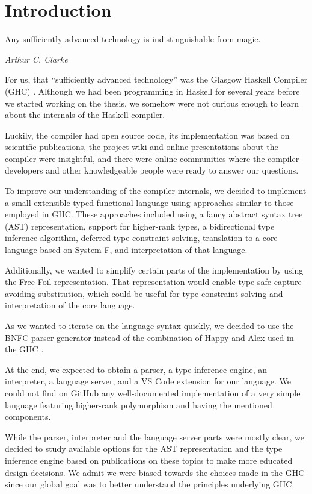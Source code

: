 \chapter{Introduction}
\label{chap:Introduction}

\epigraph{Any sufficiently advanced technology is indistinguishable from magic.}{\textit{Arthur C. Clarke}}

For us, that ``sufficiently advanced technology'' was the Glasgow Haskell Compiler (GHC) \cite{ghc-site}.
Although we had been programming in Haskell for several years before we started working on the thesis, we somehow were not curious enough to learn about the internals of the Haskell compiler.

Luckily, the compiler had open source code, its implementation was based on scientific publications, the project wiki and online presentations about the compiler were insightful, and there were online communities where the compiler developers and other knowledgeable people were ready to answer our questions.

To improve our understanding of the compiler internals, we decided to implement a small extensible typed functional language using approaches similar to those employed in GHC.
These approaches included using a fancy abstract syntax tree (AST) representation, support for higher-rank types, a bidirectional type inference algorithm, deferred type constraint solving, translation to a core language based on System F, and interpretation of that language.

Additionally, we wanted to simplify certain parts of the implementation by using the Free Foil \cite{kudasov-free-2024} representation. That representation would enable type-safe capture-avoiding substitution, which could be useful for type constraint solving and interpretation of the core language.

As we wanted to iterate on the language syntax quickly, we decided to use the BNFC parser generator \cite{bnfc-parser-generator} instead of the combination of Happy and Alex used in the GHC \cite{ghc-2025}.

At the end, we expected to obtain a parser, a type inference engine, an interpreter, a language server, and a VS Code extension for our language. We could not find on GitHub any well-documented implementation of a very simple language featuring higher-rank polymorphism and having the mentioned components.

While the parser, interpreter and the language server parts were mostly clear, we decided to study available options for the AST representation and the type inference engine based on publications on these topics to make more educated design decisions. We admit we were biased towards the choices made in the GHC since our global goal was to better understand the principles underlying GHC.

